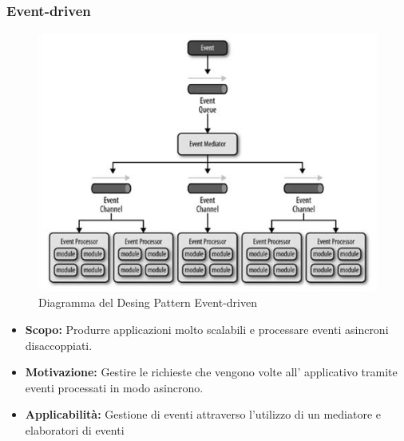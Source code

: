 \documentclass[a4paper]{article}
\begin{document}
	\subsubsection{Event-driven}
				\begin{figure}[H]
					\centering
					\includegraphics[scale=0.65]{immagini/ST/schemaevent-driven.png}
					\caption{Diagramma del Desing Pattern Event-driven}
				\end{figure}
            \begin{itemize}
				\item \textbf{Scopo:}
					Produrre applicazioni molto scalabili e processare eventi asincroni disaccoppiati.
                \item \textbf{Motivazione:} Gestire le richieste che vengono volte all' applicativo tramite eventi processati in modo asincrono.
                \item \textbf{Applicabilità:}
                	Gestione di eventi attraverso l'utilizzo di un mediatore e elaboratori di eventi		
			\end{itemize}
\end{document}
